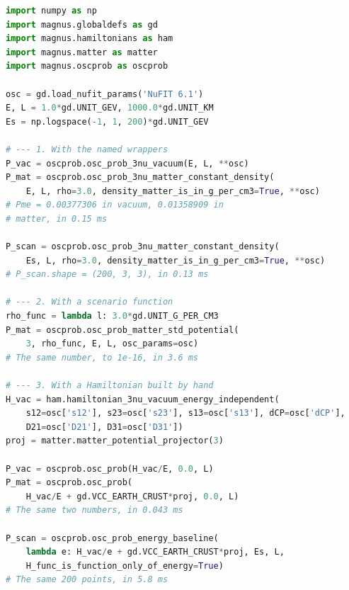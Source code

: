 \documentclass[final,5p,times,twocolumn,sort,compress]{elsarticle}
\makeatletter
\newcommand{\eq}{Eq.}
\DeclareRobustCommand{\_}{%
  \ifmmode\nfss@text{\textunderscore}\else\textunderscore\allowbreak\fi}
\newcommand{\equ}[1]{\eq~(\ref{equ:#1})}
\makeatother
\begin{document}
\begin{lstlisting}[language=Python, caption={\textbf{Vacuum and constant density, three ways.} The three-flavor probability, computed three ways. The wrappers take the oscillation parameters as keywords, here the NuFIT 6.1 values, and the density in g~cm$^{-3}$. The scenario function takes the density as a function of position. The hand-built form is the vacuum term divided by the energy plus the potential $V_{\rm CC}$ times the projector of \equ{h_matter}; {\tt VCC\_EARTH\_CRUST} is that potential at 3~g~cm$^{-3}$ and $Y_e = 1/2$. All three return the same probabilities; the times are measured under the protocol of Sec.~\ref{sec:timing_protocol}. See Sec.~\ref{sec:wrapper_vs_direct} for details.}, label={lst:constant}, float=tbp]
import numpy as np
import magnus.globaldefs as gd
import magnus.hamiltonians as ham
import magnus.matter as matter
import magnus.oscprob as oscprob

osc = gd.load_nufit_params('NuFIT 6.1')
E, L = 1.0*gd.UNIT_GEV, 1000.0*gd.UNIT_KM
Es = np.logspace(-1, 1, 200)*gd.UNIT_GEV

# --- 1. With the named wrappers
P_vac = oscprob.osc_prob_3nu_vacuum(E, L, **osc)
P_mat = oscprob.osc_prob_3nu_matter_constant_density(
    E, L, rho=3.0, density_matter_is_in_g_per_cm3=True, **osc)
# Pme = 0.00377306 in vacuum, 0.01358909 in
# matter, in 0.15 ms

P_scan = oscprob.osc_prob_3nu_matter_constant_density(
    Es, L, rho=3.0, density_matter_is_in_g_per_cm3=True, **osc)
# P_scan.shape = (200, 3, 3), in 0.13 ms

# --- 2. With a scenario function
rho_func = lambda l: 3.0*gd.UNIT_G_PER_CM3
P_mat = oscprob.osc_prob_matter_std_potential(
    3, rho_func, E, L, osc_params=osc)
# The same number, to 1e-16, in 3.6 ms

# --- 3. With a Hamiltonian built by hand
H_vac = ham.hamiltonian_3nu_vacuum_energy_independent(
    s12=osc['s12'], s23=osc['s23'], s13=osc['s13'], dCP=osc['dCP'],
    D21=osc['D21'], D31=osc['D31'])
proj = matter.matter_potential_projector(3)

P_vac = oscprob.osc_prob(H_vac/E, 0.0, L)
P_mat = oscprob.osc_prob(
    H_vac/E + gd.VCC_EARTH_CRUST*proj, 0.0, L)
# The same two numbers, in 0.043 ms

P_scan = oscprob.osc_prob_energy_baseline(
    lambda e: H_vac/e + gd.VCC_EARTH_CRUST*proj, Es, L,
    H_func_is_function_only_of_energy=True)
# The same 200 points, in 5.8 ms
\end{lstlisting}
\end{document}
